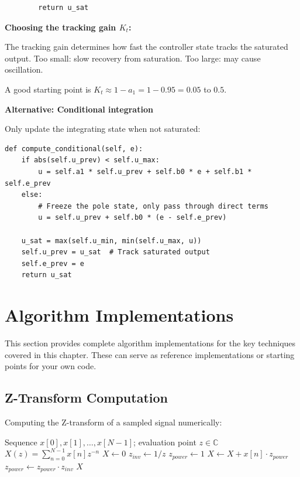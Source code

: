 \begin{example}
\begin{verbatim}
        return u_sat
\end{verbatim}

\textbf{Choosing the tracking gain $K_t$:}

The tracking gain determines how fast the controller state tracks the saturated output. Too small: slow recovery from saturation. Too large: may cause oscillation.

A good starting point is $K_t \approx 1 - a_1 = 1 - 0.95 = 0.05$ to $0.5$.

\textbf{Alternative: Conditional integration}

Only update the integrating state when not saturated:
\begin{verbatim}
def compute_conditional(self, e):
    if abs(self.u_prev) < self.u_max:
        u = self.a1 * self.u_prev + self.b0 * e + self.b1 * self.e_prev
    else:
        # Freeze the pole state, only pass through direct terms
        u = self.u_prev + self.b0 * (e - self.e_prev)

    u_sat = max(self.u_min, min(self.u_max, u))
    self.u_prev = u_sat  # Track saturated output
    self.e_prev = e
    return u_sat
\end{verbatim}
\end{example}

\section{Algorithm Implementations}
\label{sec:discrete_algorithms}

This section provides complete algorithm implementations for the key techniques covered in this chapter. These can serve as reference implementations or starting points for your own code.

\subsection{Z-Transform Computation}

Computing the Z-transform of a sampled signal numerically:

\begin{algorithm}[htbp]
\caption{Numerical Z-Transform Evaluation}
\label{alg:z_transform_eval}
\begin{algorithmic}[1]
\REQUIRE Sequence $x[0], x[1], \ldots, x[N-1]$; evaluation point $z \in \mathbb{C}$
\ENSURE $X(z) = \sum_{n=0}^{N-1} x[n] z^{-n}$
\STATE $X \gets 0$
\STATE $z_{inv} \gets 1/z$
\STATE $z_{power} \gets 1$ 
    \STATE $X \gets X + x[n] \cdot z_{power}$
    \STATE $z_{power} \gets z_{power} \cdot z_{inv}$
\ENDFOR
\RETURN $X$
\end{algorithmic}
\end{algorithm}

